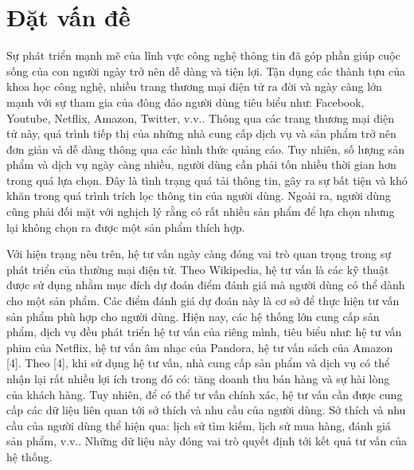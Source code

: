 \chapter{Đặt vấn đề}
\label{chap1}

Sự phát triển mạnh mẽ của lĩnh vực công nghệ thông tin đã góp phần giúp cuộc sống
của con người ngày trở nên dễ dàng và tiện lợi. Tận dụng các thành tựu của khoa học
công nghệ, nhiều trang thương mại điện tử ra đời và ngày càng lớn mạnh với sự tham
gia của đông đảo người dùng tiêu biểu như: Facebook, Youtube, Netflix, Amazon,
Twitter, v.v.. Thông qua các trang thương mại điện tử này, quá trình tiếp thị của những
nhà cung cấp dịch vụ và sản phẩm trở nên đơn giản và dễ dàng thông qua các hình thức
quảng cáo. Tuy nhiên, số lượng sản phẩm và dịch vụ ngày càng nhiều, người dùng cần
phải tốn nhiều thời gian hơn trong quá lựa chọn. Đây là tình trạng quá tải thông tin, gây
ra sự bất tiện và khó khăn trong quá trình trích lọc thông tin của người dùng. Ngoài ra,
người dùng cũng phải đối mặt với nghịch lý rằng có rất nhiều sản phẩm để lựa chọn
nhưng lại không chọn ra được một sản phẩm thích hợp.

Với hiện trạng nêu trên, hệ tư vấn ngày càng đóng vai trò quan trọng trong sự phát
triển của thường mại điện tử. Theo Wikipedia, hệ tư vấn là các kỹ thuật được sử dụng
nhằm mục đích dự đoán điểm đánh giá mà người dùng có thể dành cho một sản phẩm.
Các điểm đánh giá dự đoán này là cơ sở để thực hiện tư vấn sản phẩm phù hợp cho
người dùng. Hiện nay, các hệ thống lớn cung cấp sản phẩm, dịch vụ đều phát triển hệ tư
vấn của riêng mình, tiêu biểu như: hệ tư vấn phim của Netflix, hệ tư vấn âm nhạc của
Pandora, hệ tư vấn sách của Amazon [4]. Theo [4], khi sử dụng hệ tư vấn, nhà cung cấp
sản phẩm và dịch vụ có thể nhận lại rất nhiều lợi ích trong đó có: tăng doanh thu bán
hàng và sự hài lòng của khách hàng. Tuy nhiên, để có thể tư vấn chính xác, hệ tư vấn
cần được cung cấp các dữ liệu liên quan tới sở thích và nhu cầu của người dùng. Sở
thích và nhu cầu của người dùng thể hiện qua: lịch sử tìm kiếm, lịch sử mua hàng, đánh
giá sản phẩm, v.v.. Những dữ liệu này đóng vai trò quyết định tới kết quả tư vấn của hệ
thống.

